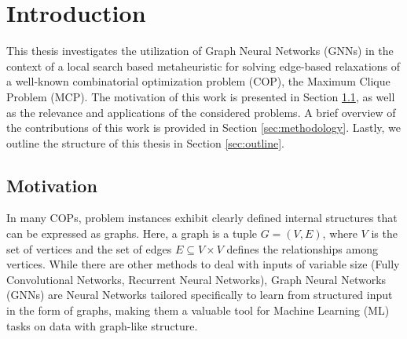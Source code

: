\documentclass[draft,final]{vutinfth} %
\begin{document}
\frontmatter %

\addstatementpage

\begin{danksagung*}
\end{danksagung*}

\begin{acknowledgements*}
\end{acknowledgements*}

\begin{kurzfassung}
\end{kurzfassung}

\begin{abstract}
\end{abstract}


\tableofcontents %

\mainmatter

\chapter{Introduction}

This thesis investigates the utilization of Graph Neural Networks (GNNs) in the context of a local search based metaheuristic for solving edge-based relaxations of a well-known combinatorial optimization problem (COP), the Maximum Clique Problem (MCP).
The motivation of this work is presented in Section \ref{sec:motivation}, as well as the relevance and applications of the considered problems. A brief overview of the contributions of this work is provided in Section \ref{sec:methodology}. Lastly, we outline the structure of this thesis in Section \ref{sec:outline}.

\section{Motivation}\label{sec:motivation}
In many COPs, problem instances exhibit clearly defined internal structures that can be expressed as graphs. Here, a graph is a tuple $G = (V, E)$, where $V$ is the set of vertices and the set of edges $E \subseteq V \times V$ defines the relationships among vertices. While there are other methods to deal with inputs of variable size (Fully Convolutional Networks, Recurrent Neural Networks), Graph Neural Networks (GNNs) are Neural Networks tailored specifically to learn from structured input in the form of graphs, making them a valuable tool for Machine Learning (ML) tasks on data with graph-like structure.   
\end{document}
